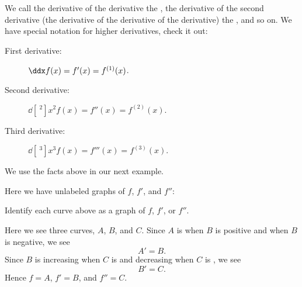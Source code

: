 \documentclass{ximera}
\begin{document}
We call the derivative of the derivative the , the derivative of the second derivative (the derivative of the derivative of the derivative) the
, and so on. We have special notation for
higher derivatives, check it out:
\begin{description}
\item[First derivative:] $\ddx f(x) = f'(x) = f^{(1)}(x)$.
\item[Second derivative:] $\dd[~^2]{x^2} f(x) = f''(x) = f^{(2)}(x)$.
\item[Third derivative:] $\dd[~^3]{x^3} f(x) = f'''(x) = f^{(3)}(x)$.
\end{description}

We use the facts above in our next example.

\begin{example}
  Here we have unlabeled graphs of $f$, $f'$, and $f''$:
  \begin{image}
  \end{image}
  Identify each curve above as a graph of $f$, $f'$, or $f''$.
  \begin{explanation} 
    Here we see three curves, $A$, $B$, and $C$. Since $A$ is
     when $B$ is
    positive and
    when $B$ is negative, we see
    \[
    A'=B.
    \]
    Since $B$ is increasing when $C$ is
     and decreasing when $C$ is
    , we see
    \[
    B'=C.
    \]
    Hence $f=A$, $f'=B$, and $f''=C$.
  \end{explanation}
\end{example}
\end{document}

